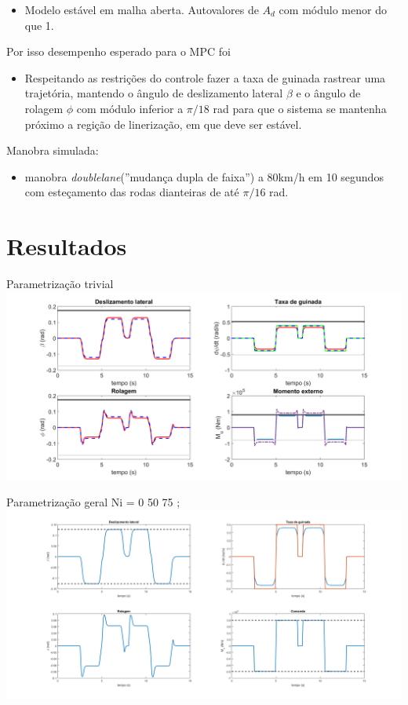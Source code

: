 \documentclass{beamer}
\begin{document}
    \begin{frame}[t]%
	
	\begin{itemize}
		\item Modelo estável em malha aberta. Autovalores de $A_d$ com módulo menor do
		que 1.
	\end{itemize}
     
     Por isso desempenho esperado para o MPC foi
	\begin{itemize}
		\item Respeitando as restrições do controle fazer a taxa de guinada rastrear
		uma trajetória, mantendo o ângulo de deslizamento lateral $\beta$ e o ângulo
		de rolagem $\phi$ com módulo inferior a $\pi/18$ rad para que o sistema se
		mantenha próximo a regição de linerização, em que deve ser estável.
	\end{itemize}     
	
	Manobra simulada:
	\begin{itemize}
		\item manobra \emph{doublelane}(''mudança dupla de faixa'') a 80km/h
		em 10 segundos com esteçamento das rodas dianteiras de até $\pi/16$ rad.
	\end{itemize}     
	
     \end{frame} 

{
  \section{Resultados}%
  \begin{frame}%
  Parametrização trivial
  \includegraphics[width=0.8\paperwidth]{result.png}%
   \end{frame}%
      
  \begin{frame}%
  Parametrização geral Ni = {0  50 75 };
  	\includegraphics[width=0.8\paperwidth]{generalparam.png}%
  \end{frame}%
      
}
  
\end{document}
